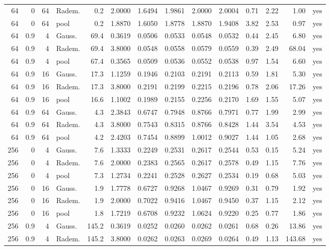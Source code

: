 \documentclass[11pt]{article}
\theoremstyle{remark}
\begin{document}
\begin{table}[!htbp]
{\begin{tabular}{rrrlrrrrrrrrrl}
64 & 0 & 64 & Radem. & 0.2 & 2.0000 & 1.6494 & 1.9861 & 2.0000 & 2.0004 & 0.71 & 2.22 & 1.00 & yes \\
64 & 0 & 64 & pool & 0.2 & 1.8870 & 1.6050 & 1.8778 & 1.8870 & 1.9408 & 3.82 & 2.53 & 0.97 & yes \\
64 & 0.9 & 4 & Gauss. & 69.4 & 0.3619 & 0.0506 & 0.0533 & 0.0548 & 0.0532 & 0.44 & 2.45 & 6.80 & yes \\
64 & 0.9 & 4 & Radem. & 69.4 & 3.8000 & 0.0548 & 0.0558 & 0.0579 & 0.0559 & 0.39 & 2.49 & 68.04 & yes \\
64 & 0.9 & 4 & pool & 67.4 & 0.3565 & 0.0509 & 0.0536 & 0.0552 & 0.0538 & 0.97 & 1.54 & 6.60 & yes \\
64 & 0.9 & 16 & Gauss. & 17.3 & 1.1259 & 0.1946 & 0.2103 & 0.2191 & 0.2113 & 0.59 & 1.81 & 5.30 & yes \\
64 & 0.9 & 16 & Radem. & 17.3 & 3.8000 & 0.2191 & 0.2199 & 0.2215 & 0.2196 & 0.78 & 2.06 & 17.26 & yes \\
64 & 0.9 & 16 & pool & 16.6 & 1.1002 & 0.1989 & 0.2155 & 0.2256 & 0.2170 & 1.69 & 1.55 & 5.07 & yes \\
64 & 0.9 & 64 & Gauss. & 4.3 & 2.3843 & 0.6747 & 0.7948 & 0.8766 & 0.7971 & 0.77 & 1.99 & 2.99 & yes \\
64 & 0.9 & 64 & Radem. & 4.3 & 3.8000 & 0.7543 & 0.8315 & 0.8766 & 0.8428 & 1.44 & 3.54 & 4.53 & yes \\
64 & 0.9 & 64 & pool & 4.2 & 2.4203 & 0.7454 & 0.8899 & 1.0012 & 0.9027 & 1.44 & 1.05 & 2.68 & yes \\
256 & 0 & 4 & Gauss. & 7.6 & 1.3333 & 0.2249 & 0.2531 & 0.2617 & 0.2544 & 0.53 & 0.15 & 5.24 & yes \\
256 & 0 & 4 & Radem. & 7.6 & 2.0000 & 0.2383 & 0.2565 & 0.2617 & 0.2578 & 0.49 & 1.15 & 7.76 & yes \\
256 & 0 & 4 & pool & 7.3 & 1.2734 & 0.2241 & 0.2528 & 0.2627 & 0.2534 & 0.19 & 0.68 & 5.03 & yes \\
256 & 0 & 16 & Gauss. & 1.9 & 1.7778 & 0.6727 & 0.9268 & 1.0467 & 0.9269 & 0.31 & 0.79 & 1.92 & yes \\
256 & 0 & 16 & Radem. & 1.9 & 2.0000 & 0.7022 & 0.9416 & 1.0467 & 0.9450 & 0.37 & 1.15 & 2.12 & yes \\
256 & 0 & 16 & pool & 1.8 & 1.7219 & 0.6708 & 0.9232 & 1.0624 & 0.9220 & 0.25 & 0.77 & 1.86 & yes \\
256 & 0.9 & 4 & Gauss. & 145.2 & 0.3619 & 0.0252 & 0.0260 & 0.0262 & 0.0261 & 0.68 & 0.26 & 13.86 & yes \\
256 & 0.9 & 4 & Radem. & 145.2 & 3.8000 & 0.0262 & 0.0263 & 0.0269 & 0.0264 & 0.49 & 1.13 & 143.68 & yes \\

\end{tabular}}
\end{table}
\end{document}
